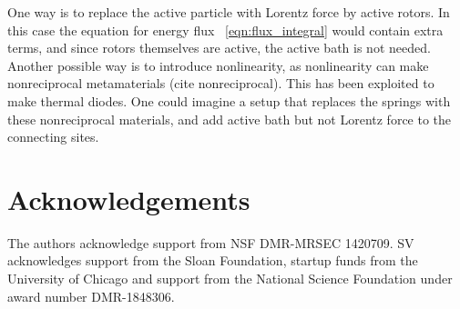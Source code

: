 \documentclass[
 preprint,
 preprintnumbers,
 amsmath,amssymb,
 aps,
 pre,
 longbibliography,
 superscriptaddress,
 10pt, twocolumn
]{revtex4-1}
\begin{document}


One way is to replace the active particle with Lorentz force by active rotors. In this case the equation for energy flux \eqnname~\eqref{eqn:flux_integral} would contain extra terms, and since rotors themselves are active, the active bath is not needed.
Another possible way is to introduce nonlinearity, as nonlinearity can make nonreciprocal metamaterials  (cite nonreciprocal). This has been exploited to make thermal diodes. One could imagine a setup that replaces the springs with these nonreciprocal materials, and add active bath but not Lorentz force to the connecting sites.



\section*{Acknowledgements}
The authors acknowledge support from NSF DMR-MRSEC 1420709. SV acknowledges support from the Sloan Foundation, startup funds from the University of Chicago and support from the National Science Foundation under award number DMR-1848306.


\end{document}
